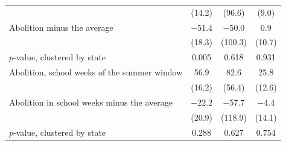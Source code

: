 \begin{tabular}{@{}l ccc@{}}
 & (14.2) & (96.6) & (9.0) \\
Abolition minus the average & $-$51.4 & $-$50.0 & 0.9 \\
 & (18.3) & (100.3) & (10.7) \\
\quad $p$-value, clustered by state & 0.005 & 0.618 & 0.931 \\
\addlinespace
Abolition, school weeks of the summer window & 56.9 & 82.6 & 25.8 \\
 & (16.2) & (56.4) & (12.6) \\
Abolition in school weeks minus the average & $-$22.2 & $-$57.7 & $-$4.4 \\
 & (20.9) & (118.9) & (14.1) \\
\quad $p$-value, clustered by state & 0.288 & 0.627 & 0.754 \\
\bottomrule
\end{tabular}
